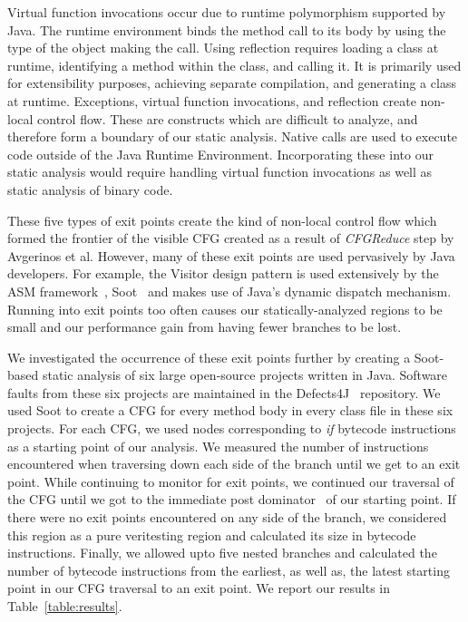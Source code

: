 %
Virtual function invocations occur due to runtime polymorphism supported by Java.
%
The runtime environment binds the method call to its body by using the type of the object making the call.
%
Using reflection requires loading a class at runtime, identifying a method within the class, and calling it.
%
It is primarily used for extensibility purposes, achieving separate compilation, and generating a class at runtime.
%
Exceptions, virtual function invocations, and reflection create non-local control flow.
%
These are constructs which are difficult to analyze, and therefore form a boundary of our static analysis.
%
Native calls are used to execute code outside of the Java Runtime Environment.
%
Incorporating these into our static analysis would require handling virtual function invocations as well as static analysis of binary code.

These five types of exit points create the kind of non-local control flow which formed the frontier of the visible CFG created as a result of \textit{CFGReduce} step by Avgerinos et al.%
However, many of these exit points are used pervasively by Java developers.
%
For example, the Visitor design pattern is used extensively by the ASM framework~\cite{asm}, Soot~\cite{soot} and makes use of Java\rq s dynamic dispatch mechanism.
%
Running into exit points too often causes our statically-analyzed regions to be small and our performance gain from having fewer branches to be lost.

We investigated the occurrence of these exit points further by creating a Soot-based static analysis of six large open-source projects written in Java.
%
Software faults from these six projects are maintained in the Defects4J~\cite{defects4j} repository.
%
We used Soot to create a CFG for every method body in every class file in these six projects.
%
For each CFG, we used nodes corresponding to \textit{if} bytecode instructions as a starting point of our analysis.
%
We measured the number of instructions encountered when traversing down each side of the branch until we get to an exit point.
%
While continuing to monitor for exit points, we continued our traversal of the CFG until we got to the immediate post dominator~\cite{dragon-book} of our starting point.
%
If there were no exit points encountered on any side of the branch, we considered this region as a pure veritesting region and calculated its size in bytecode instructions.
%
Finally, we allowed upto five nested branches and calculated the number of bytecode instructions from the earliest, as well as, the latest starting point in our CFG traversal to an exit point.
%
We report our results in Table~\ref{table:results}.

